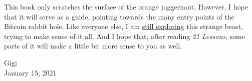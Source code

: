 This book only scratches the surface of the orange juggernaut. However, I hope
that it will serve as a guide, pointing towards the many entry points of the
Bitcoin rabbit hole. Like everyone else, I am
\href{https://twitter.com/dergigi/status/1285485658656649216?s=20}{still
exploring} this strange beast, trying to make sense of it all. And I hope that,
after reading \textit{21 Lessons}, some parts of it will make a little bit more
sense to you as well.

\begin{flushright}
  Gigi \\
  January 15, 2021
\end{flushright}
